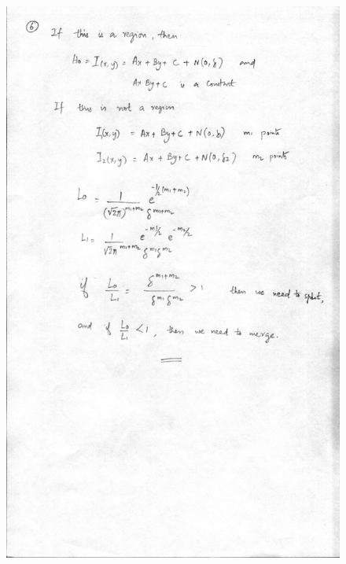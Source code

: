 \documentclass{article}
\begin{document}
\begin{figure}
\includegraphics[width=15cm]{qn6.jpg}
\end{figure}
\end{document}
